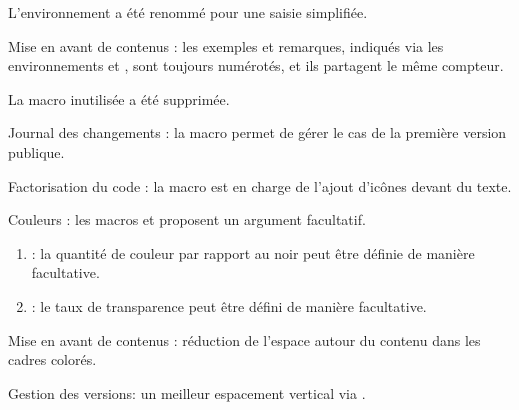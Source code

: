 \documentclass[12pt, a4paper]{article}
\begin{document}
\begin{tdocbreak}
	\item L'environnement  a été renommé  pour une saisie simplifiée.

	\item Mise en avant de contenus : les exemples et remarques, indiqués via les environnements  et , sont toujours numérotés, et ils partagent le même compteur.

	\item La macro inutilisée  a été supprimée.
\end{tdocbreak}


\begin{tdocnew}
    \item Journal des changements : la macro  permet de gérer le cas de la première version publique.

    \item Factorisation du code : la macro  est en charge de l'ajout d'icônes devant du texte.
\end{tdocnew}


\begin{tdocupdate}
	\item Couleurs : les macros  et  proposent un argument facultatif.
	\begin{enumerate}
		\item {} : la quantité de couleur par rapport au noir peut être définie de manière facultative.

		\item {} : le taux de transparence peut être défini de manière facultative.
	\end{enumerate}

    \item Mise en avant de contenus : réduction de l'espace autour du contenu dans les cadres colorés.

	\item Gestion des versions: un meilleur espacement vertical via .
\end{tdocupdate}
\end{document}
